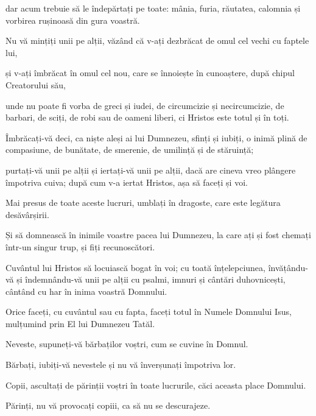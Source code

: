 {dar acum trebuie să le îndepărtați pe toate: mânia, furia, răutatea, calomnia și vorbirea rușinoasă din gura voastră.

Nu vă mințiți unii pe alții, văzând că v-ați dezbrăcat de omul cel vechi cu faptele lui,

și v-ați îmbrăcat în omul cel nou, care se înnoiește în cunoaștere, după chipul Creatorului său,

unde nu poate fi vorba de greci și iudei, de circumcizie și necircumcizie, de barbari, de sciți, de robi sau de oameni liberi, ci Hristos este totul și în toți.


\par }{\PP {}Îmbrăcați-vă deci, ca niște aleși ai lui Dumnezeu, sfinți și iubiți, o inimă plină de compasiune, de bunătate, de smerenie, de umilință și de stăruință;

purtați-vă unii pe alții și iertați-vă unii pe alții, dacă are cineva vreo plângere împotriva cuiva; după cum v-a iertat Hristos, așa să faceți și voi.


\par }{\PP {}Mai presus de toate aceste lucruri, umblați în dragoste, care este legătura desăvârșirii.

Și să domnească în inimile voastre pacea lui Dumnezeu, la care ați și fost chemați într-un singur trup, și fiți recunoscători.

Cuvântul lui Hristos să locuiască bogat în voi; cu toată înțelepciunea, învățându-vă și îndemnându-vă unii pe alții cu psalmi, imnuri și cântări duhovnicești, cântând cu har în inima voastră Domnului.


\par }{\PP {}Orice faceți, cu cuvântul sau cu fapta, faceți totul în Numele Domnului Isus, mulțumind prin El lui Dumnezeu Tatăl.


\par }{\PP {}Neveste, supuneți-vă bărbaților voștri, cum se cuvine în Domnul.


\par }{\PP {}Bărbați, iubiți-vă nevestele și nu vă înverșunați împotriva lor.


\par }{\PP {}Copii, ascultați de părinții voștri în toate lucrurile, căci aceasta place Domnului.


\par }{\PP {}Părinți, nu vă provocați copiii, ca să nu se descurajeze.


}
